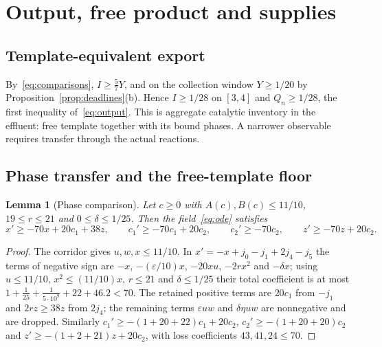 \documentclass[11pt,a4paper]{article}
\theoremstyle{plain}
\newtheorem{lemma}[theorem]{Lemma}
\theoremstyle{definition}
\theoremstyle{remark}
\newcommand{\eps}{\varepsilon}
\newcommand{\Iv}{I}
\begin{document}
\section{Output, free product and supplies}\label{sec:output}

\subsection{Template-equivalent export}
By~\eqref{eq:comparisons}, $\Iv\ge\tfrac57Y$, and on the collection window $Y\ge1/20$ by Proposition~\ref{prop:deadlines}(b). Hence $\Iv\ge1/28$ on $[3,4]$ and $Q_n\ge1/28$, the first inequality of~\eqref{eq:output}. This is aggregate catalytic inventory in the effluent: free template together with its bound phases. A narrower observable requires transfer through the actual reactions.

\subsection{Phase transfer and the free-template floor}
\begin{lemma}[Phase comparison]\label{lem:phase}
Let $c\ge0$ with $A(c),B(c)\le11/10$, $19\le r\le21$ and $0\le\delta\le1/25$. Then the field~\eqref{eq:ode} satisfies
\begin{equation}\label{eq:phase}
x'\ge-70x+20c_1+38z,\qquad c_1'\ge-70c_1+20c_2,\qquad c_2'\ge-70c_2,\qquad z'\ge-70z+20c_2 .
\end{equation}
\end{lemma}
\begin{proof}
The corridor gives $u,w,x\le11/10$. In $x'=-x+j_0-j_1+2j_4-j_5$ the terms of negative sign are $-x$, $-(\eps/10)x$, $-20xu$, $-2rx^2$ and $-\delta x$; using $u\le11/10$, $x^2\le(11/10)x$, $r\le21$ and $\delta\le1/25$ their total coefficient is at most $1+\tfrac1{25}+\tfrac1{5\cdot10^9}+22+46.2<70$. The retained positive terms are $20c_1$ from $-j_1$ and $2rz\ge38z$ from $2j_4$; the remaining terms $\eps uw$ and $\delta\eta uw$ are nonnegative and are dropped. Similarly $c_1'\ge-(1+20+22)c_1+20c_2$, $c_2'\ge-(1+20+20)c_2$ and $z'\ge-(1+2+21)z+20c_2$, with loss coefficients $43,41,24\le70$.
\end{proof}
\end{document}
